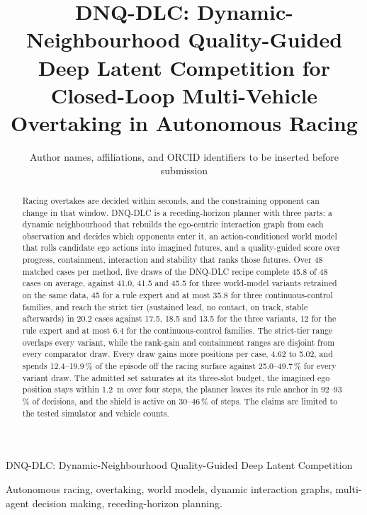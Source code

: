 \documentclass[journal]{IEEEtran}
\begin{document}

\title{DNQ-DLC: Dynamic-Neighbourhood Quality-Guided Deep Latent Competition for Closed-Loop Multi-Vehicle Overtaking in Autonomous Racing}

\author{Author names, affiliations, and ORCID identifiers to be inserted before submission}

%
{DNQ-DLC: Dynamic-Neighbourhood Quality-Guided Deep Latent Competition}

\maketitle

\begin{abstract}
Racing overtakes are decided within seconds, and the constraining opponent
can change in that window. DNQ-DLC is a receding-horizon planner with three
parts: a dynamic neighbourhood that rebuilds the ego-centric interaction graph
from each observation and decides which opponents enter it, an action-conditioned
world model that rolls candidate ego actions into imagined futures, and a
quality-guided score over progress, containment, interaction and stability that
ranks those futures. Over 48 matched cases per method, five draws of the DNQ-DLC
recipe complete 45.8 of 48 cases on average, against 41.0, 41.5 and 45.5 for
three world-model variants retrained on the same data, 45 for a rule expert and
at most 35.8 for three continuous-control families, and reach the strict tier
(sustained lead, no contact, on track, stable afterwards) in 20.2 cases against
17.5, 18.5 and 13.5 for the three variants, 12 for the rule expert and at most
6.4 for the continuous-control families. The strict-tier range overlaps every
variant, while the rank-gain and containment ranges are disjoint from every
comparator draw. Every draw gains more positions per case, 4.62 to 5.02, and
spends 12.4--19.9\,\% of the episode off the racing surface against 25.0--49.7\,\%
for every variant draw. The admitted set saturates at its three-slot budget, the
imagined ego position stays within 1.2~m over four steps, the planner leaves its
rule anchor in 92--93\,\% of decisions, and the shield is active on 30--46\,\% of
steps. The claims are limited to the tested simulator and vehicle counts.
\end{abstract}

\begin{IEEEkeywords}
Autonomous racing, overtaking, world models, dynamic interaction graphs,
multi-agent decision making, receding-horizon planning.
\end{IEEEkeywords}
\end{document}
